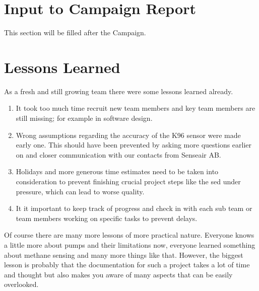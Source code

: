 \documentclass[
  a4paper,
  11pt,
  openany,
  parskip,
  toc=totoc,
  listof=totoc,
  bibliography=totoc
]{scrreprt}
\begin{document}

\section{Input to Campaign Report}

This section will be filled after the Campaign.

\section{Lessons Learned}

As a fresh and still growing team there were some lessons learned already. 
\begin{enumerate}
  \item It took too much time recruit new team members and key team members are still missing; for example in software design.
  \item Wrong assumptions regarding the accuracy of the K96 sensor were made early one. This should have been prevented by asking more questions earlier on and closer communication with our contacts from Senseair AB.
  \item Holidays and more generous time estimates need to be taken into consideration to prevent finishing crucial project steps like the \gls{sed} under pressure, which can lead to worse quality.
  \item It it important to keep track of progress and check in with each sub team or team members working on specific tasks to prevent delays.
\end{enumerate}
Of course there are many more lessons of more practical nature. Everyone knows a little more about pumps and their limitations now, everyone learned something about methane sensing and many more things like that. However, the biggest lesson is probably that the documentation for such a project takes a lot of time and thought but also makes you aware of many aspects that can be easily overlooked.
\end{document}
